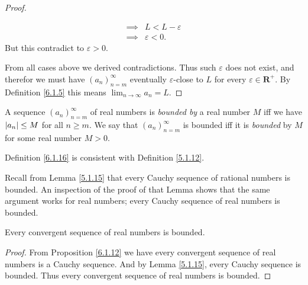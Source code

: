 \begin{proof}
\begin{itemize}
\begin{align*}
                  \implies & L < L - \varepsilon                                                                   \\
                  \implies & \varepsilon < 0.
              \end{align*}
              But this contradict to \(\varepsilon > 0\).
    \end{itemize}
    From all cases above we derived contradictions.
    Thus such \(\varepsilon\) does not exist, and therefor we must have \((a_n)_{n = m}^\infty\) eventually \(\varepsilon\)-close to \(L\) for every \(\varepsilon \in \mathbf{R}^+\).
    By Definition \ref{6.1.5} this means \(\lim_{n \to \infty} a_n = L\).
\end{proof}

\begin{definition}\label{6.1.16}
    A sequence \((a_n)_{n = m}^\infty\) of real numbers is \emph{bounded by} a real number \(M\) iff we have \(\abs*{a_n} \leq M\) for all \(n \geq m\).
    We say that \((a_n)_{n = m}^\infty\) is bounded iff it is \emph{bounded} by \(M\) for some real number \(M > 0\).
\end{definition}

\begin{note}
    Definition \ref{6.1.16} is consistent with Definition \ref{5.1.12}.
\end{note}

\begin{note}
    Recall from Lemma \ref{5.1.15} that every Cauchy sequence of rational numbers is bounded.
    An inspection of the proof of that Lemma shows that the same argument works for real numbers;
    every Cauchy sequence of real numbers is bounded.
\end{note}

\begin{corollary}\label{6.1.17}
    Every convergent sequence of real numbers is bounded.
\end{corollary}

\begin{proof}
    From Proposition \ref{6.1.12} we have every convergent sequence of real numbers is a Cauchy sequence.
    And by Lemma \ref{5.1.15}, every Cauchy sequence is bounded.
    Thus every convergent sequence of real numbers is bounded.
\end{proof}

